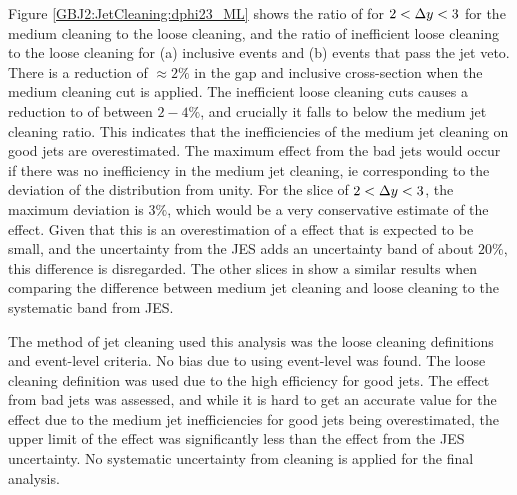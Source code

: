 Figure \ref{GBJ2:JetCleaning:dphi23_ML} shows the ratio of \dphiDist for $2<\mbox{$\Delta y$}{}<3$ for the medium cleaning to the loose cleaning, and the ratio of inefficient loose cleaning to the loose cleaning for (a) inclusive events and (b) events that pass the jet veto.
There is a reduction of $\approx 2\%$ in the gap and inclusive cross-section when the medium cleaning cut is applied.
The inefficient loose cleaning cuts causes a reduction to \dphiDist{} of between $2-4\%$, and crucially it falls to below the medium jet cleaning ratio. 
This indicates that the inefficiencies of the medium jet cleaning on good jets are overestimated.
The maximum effect from the bad jets would occur if there was no inefficiency in the medium jet cleaning, ie corresponding to the deviation of the distribution from unity. 
For the slice of $2<\mbox{$\Delta y$}{}<3$, the maximum deviation is $3\%$, which would be a very conservative estimate of the effect.
Given that this is an overestimation of a effect that is expected to be small, and the uncertainty from the JES adds an uncertainty band of about $20\%$, this difference is disregarded. 
The other slices in \dy{} show a similar results when comparing the difference between medium jet cleaning and loose cleaning to the systematic band from JES.


The method of jet cleaning used this analysis was the loose cleaning definitions and event-level criteria.
No bias due to using event-level was found. 
The loose cleaning definition was used due to the high efficiency for good jets.
The effect from bad jets was assessed, and while it is hard to get an accurate value for the effect due to the medium jet inefficiencies for good jets being overestimated, the upper limit of the effect was significantly less than the effect from the JES uncertainty. 
No systematic uncertainty from cleaning is applied for the final analysis.


